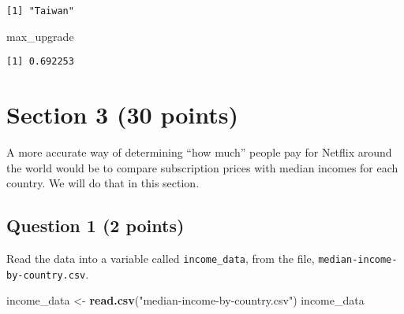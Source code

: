 \documentclass[
]{article}
\newenvironment{Shaded}{\begin{snugshade}}{\end{snugshade}}
\newcommand{\FunctionTok}[1]{\textcolor[rgb]{0.13,0.29,0.53}{\textbf{#1}}}
\newcommand{\NormalTok}[1]{#1}
\newcommand{\OtherTok}[1]{\textcolor[rgb]{0.56,0.35,0.01}{#1}}
\newcommand{\StringTok}[1]{\textcolor[rgb]{0.31,0.60,0.02}{#1}}
\begin{document}
\begin{verbatim}
[1] "Taiwan"
\end{verbatim}

\begin{Shaded}
\begin{Highlighting}[]
\NormalTok{max\_upgrade}
\end{Highlighting}
\end{Shaded}

\begin{verbatim}
[1] 0.692253
\end{verbatim}

\section{Section 3 (30 points)}\label{section-3-30-points}

A more accurate way of determining ``how much'' people pay for Netflix
around the world would be to compare subscription prices with median
incomes for each country. We will do that in this section.

\subsection{Question 1 (2 points)}\label{question-1-2-points}

Read the data into a variable called \texttt{income\_data}, from the
file, \texttt{median-income-by-country.csv}.

\begin{Shaded}
\begin{Highlighting}[]
\NormalTok{income\_data }\OtherTok{\textless{}{-}} \FunctionTok{read.csv}\NormalTok{(}\StringTok{"median{-}income{-}by{-}country.csv"}\NormalTok{)}
\NormalTok{income\_data}
\end{Highlighting}
\end{Shaded}
\end{document}
